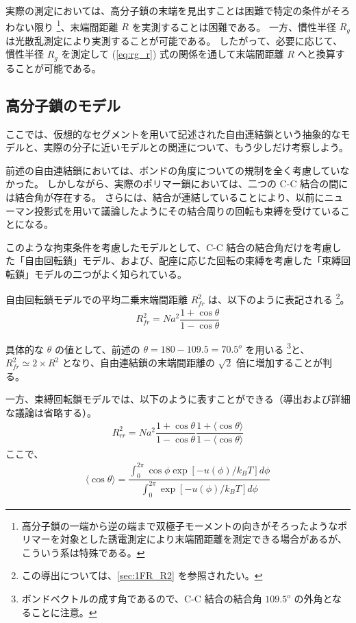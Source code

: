 \documentclass[uplatex,dvipdfmx,a4paper,11pt, titlepage]{jsarticle}
\begin{document}
実際の測定においては、高分子鎖の末端を見出すことは困難で特定の条件がそろわない限り
\footnote
{
高分子鎖の一端から逆の端まで双極子モーメントの向きがそろったようなポリマーを対象とした誘電測定により末端間距離を測定できる場合があるが、こういう系は特殊である。
}、末端間距離 $R$ を実測することは困難である。
一方、慣性半径 $R_g$ は光散乱測定により実測することが可能である。
したがって、必要に応じて、慣性半径 $R_g$ を測定して (\ref{eq:rg_r}) 式の関係を通して末端間距離 $R$ へと換算することが可能である。

\subsection{高分子鎖のモデル}

ここでは、仮想的なセグメントを用いて記述された自由連結鎖という抽象的なモデルと、実際の分子に近いモデルとの関連について、もう少しだけ考察しよう。

前述の自由連結鎖においては、ボンドの角度についての規制を全く考慮していなかった。
しかしながら、実際のポリマー鎖においては、二つの C-C 結合の間には結合角が存在する。
さらには、結合が連結していることにより、以前にニューマン投影式を用いて議論したようにその結合周りの回転も束縛を受けていることになる。

このような拘束条件を考慮したモデルとして、C-C 結合の結合角だけを考慮した「自由回転鎖」モデル、および、配座に応じた回転の束縛を考慮した「束縛回転鎖」モデルの二つがよく知られている。

自由回転鎖モデルでの平均二乗末端間距離 $R_{fr}^2$ は、以下のように表記される
\footnote
{
この導出については、\ref{sec:1FR_R2} を参照されたい。
}。
\begin{align}
R_{fr}^2 = Na^2 \dfrac{1+\cos \theta}{1-\cos \theta}
\label{eq:r2_sokubaku}
\end{align}

具体的な $\theta$ の値として、前述の $\theta = 180-109.5= 70.5^o$ を用いる
\footnote
{
ボンドベクトルの成す角であるので、C-C 結合の結合角 $109.5^o$ の外角となることに注意。
}と、$R_{fr}^2 \simeq 2 \times R^2$ となり、自由連結鎖の末端間距離の $\sqrt{2}$ 倍に増加することが判る。


一方、束縛回転鎖モデルでは、以下のように表すことができる（導出および詳細な議論は省略する）。
\begin{align}
R_{rr}^2 = Na^2 \dfrac{1+\cos \theta}{1-\cos \theta} \dfrac{1+ \langle \cos \theta \rangle}{1- \langle \cos \theta \rangle}
\label{eq:r2_sokubaku}
\end{align}
ここで、
\begin{align}
\langle \cos \theta \rangle = \dfrac{\displaystyle \int_0^{2 \pi} \cos \phi \exp [-u(\phi)/k_B T] d \phi}{\displaystyle \int_0^{2\pi} \exp [-u(\phi)/k_B T] d \phi}
\end{align}
\end{document}
